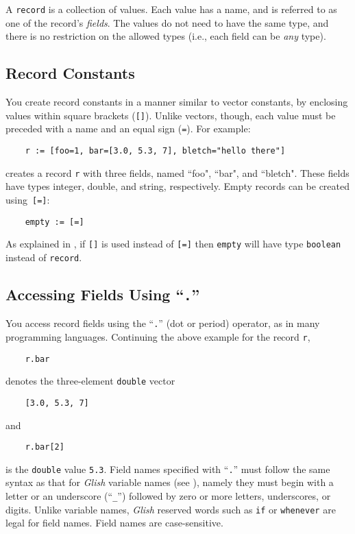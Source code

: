 A {\tt record} is a collection of values.  Each value has a name, and
is referred to as one of the record's {\em fields\/}.  The values do
not need to have the same type, and there is no restriction on the
allowed types (i.e., each field can be {\em any} type).

\subsection{Record Constants}
\label{record-constants}

You create record constants in a manner similar to vector constants,
by enclosing values within square brackets ({\tt []}).  Unlike
vectors, though,
each value must be preceded with a name and an
equal sign ({\tt =}).  For example:
\begin{verbatim}
    r := [foo=1, bar=[3.0, 5.3, 7], bletch="hello there"]
\end{verbatim}
creates a record {\tt r} with three fields, named ``foo", ``bar",
and ``bletch".  These fields have types integer, double, and string,
respectively.  Empty records can be created using~{\tt [=]}:
\begin{verbatim}
    empty := [=]
\end{verbatim}
As explained in ,
if {\tt []} is used instead of {\tt [=]} then {\tt empty} will have
type {\tt boolean} instead of {\tt record}.

\subsection{Accessing Fields Using ``{\tt .}''}
\label{record-dot}

You access record fields using the ``{\tt .}'' (dot or period) operator,
as in many programming languages.  Continuing the above example for the record
{\tt r},
\begin{verbatim}
    r.bar
\end{verbatim}
denotes the three-element {\tt double} vector
\begin{verbatim}
    [3.0, 5.3, 7]
\end{verbatim}
and
\begin{verbatim}
    r.bar[2]
\end{verbatim}
is the {\tt double} value {\tt 5.3}.  Field names specified with ``{\tt .}''
must follow the same syntax as that for {\em Glish} variable names (see
), namely they must begin with a letter or
an underscore (``{\tt \_}'') followed by zero or more letters, underscores,
or digits.  Unlike variable names, {\em Glish} reserved words such as
{\tt if} or {\tt whenever} are legal for field names.  Field names are
case-sensitive.

